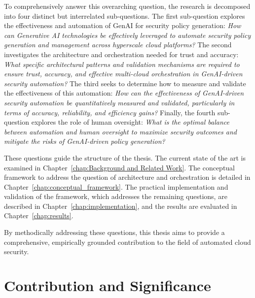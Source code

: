 To comprehensively answer this overarching question, the research is decomposed into four distinct but interrelated sub-questions.
The first sub-question explores the effectiveness and automation of GenAI for security policy generation: \textit{How can Generative AI technologies be effectively leveraged to automate security policy generation and management across hyperscale cloud platforms?}
The second investigates the architecture and orchestration needed for trust and accuracy: \textit{What specific architectural patterns and validation mechanisms are required to ensure trust, accuracy, and effective multi-cloud orchestration in GenAI-driven security automation?}
The third seeks to determine how to measure and validate the effectiveness of this automation: \textit{How can the effectiveness of GenAI-driven security automation be quantitatively measured and validated, particularly in terms of accuracy, reliability, and efficiency gains?}
Finally, the fourth sub-question explores the role of human oversight: \textit{What is the optimal balance between automation and human oversight to maximize security outcomes and mitigate the risks of GenAI-driven policy generation?}

These questions guide the structure of the thesis. The current state of the art is examined in Chapter~\ref{chap:Background and Related Work}. The conceptual framework to address the question of architecture and orchestration is detailed in Chapter~\ref{chap:conceptual_framework}. The practical implementation and validation of the framework, which addresses the remaining questions, are described in Chapter~\ref{chap:implementation}, and the results are evaluated in Chapter~\ref{chap:results}.

By methodically addressing these questions, this thesis aims to provide a comprehensive, empirically grounded contribution to the field of automated cloud security.

\section{Contribution and Significance}
\label{sec:contribution}

